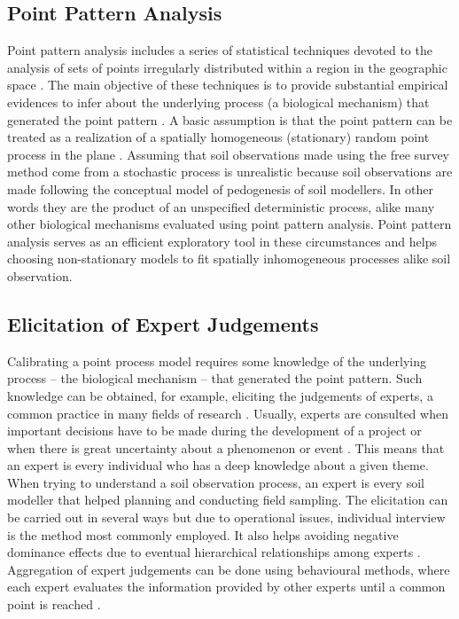 \subsection{Point Pattern Analysis}

Point pattern analysis includes a series of statistical techniques devoted to the analysis of sets of points 
irregularly distributed within a region in the geographic space \cite{Diggle2003}. The main objective of these 
techniques is to provide substantial empirical evidences to infer about the underlying process (a biological 
mechanism) that generated the point pattern \cite{BivandEtAl2008}. A basic assumption is that the point pattern
can be treated as a realization of a spatially homogeneous (stationary) random point process in the plane 
\cite{Diggle2003}. Assuming that soil observations made using the free survey method come from a stochastic 
process is unrealistic because soil observations are made following the conceptual model of pedogenesis of soil
modellers. In other words they are the product of an unspecified deterministic process, alike many other 
biological mechanisms evaluated using point pattern analysis. Point pattern analysis serves as an efficient 
exploratory tool in these circumstances and helps choosing non-stationary models to fit spatially inhomogeneous
processes \cite{Baddeley2010} alike soil observation.

\subsection{Elicitation of Expert Judgements}

Calibrating a point process model requires some knowledge of the underlying process -- the biological 
mechanism -- that generated the point pattern. Such knowledge can be obtained, for example, eliciting the 
judgements of experts, a common practice in many fields of research \cite{OHaganEtAl2006}. Usually, experts 
are consulted when important decisions have to be made during the development of a project or when there is 
great uncertainty about a phenomenon or event \cite{MeyerEtAl2001}. This means that an expert is every 
individual who has a deep knowledge about a given theme. When trying to understand a soil observation process,
an expert is every soil modeller that helped planning and conducting field sampling. The elicitation can be 
carried out in several ways \cite{Cooke1991, MeyerEtAl2001, OHaganEtAl2006} but due to operational issues, 
individual interview is the method most commonly employed. It also helps avoiding negative dominance effects 
due to eventual hierarchical relationships among experts \cite{Cooke1991}. Aggregation of expert judgements can 
be done using behavioural methods, where each expert evaluates the information provided by other experts until 
a common point is reached \cite{OrsiEtAl2011}.

